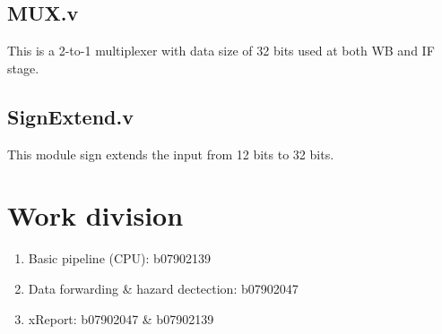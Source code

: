 \documentclass{article}
\begin{document}
\subsection{MUX.v}
This is a 2-to-1 multiplexer with data size of 32 bits used at both WB and IF stage.

\subsection{SignExtend.v}
This module sign extends the input from 12 bits to 32 bits.

\section{Work division}
\begin{enumerate}
    \item Basic pipeline (CPU): b07902139
    \item Data forwarding \& hazard dectection: b07902047
    \item xReport: b07902047 \& b07902139
\end{enumerate}
\end{document}

